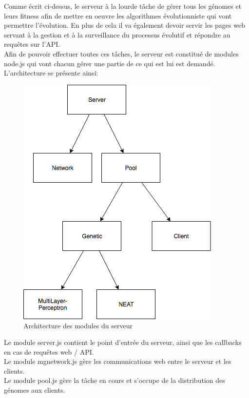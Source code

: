 \documentclass{article}
\begin{document}
Comme écrit ci-dessus, le serveur à la lourde tâche de gérer tous les génomes et leurs fitness afin de mettre en oeuvre les algorithmes évolutionniste qui vont permettre l'évolution. En plus de cela il va également devoir servir les pages web servant à la gestion et à la surveillance du processus évolutif et répondre au requêtes sur l'API.\\
Afin de pouvoir effectuer toutes ces tâches, le serveur est constitué de modules node.js qui vont chacun gérer une partie de ce qui est lui est demandé.\\
L'architecture se présente ainsi:
\begin{figure}[H]
\begin{center}
	\includegraphics[scale=0.5]{"server.png"} 
	\caption{Architecture des modules du serveur}
\end{center}
\end{figure}

Le module server.js contient le point d'entrée du serveur, ainsi que les callbacks en cas de requêtes web / API.\\

Le module mgnetwork.js gère les communications web entre le serveur et les clients.\\

Le module pool.js gère la tâche en cours et s'occupe de la distribution des génomes aux clients.\\
\end{document}
